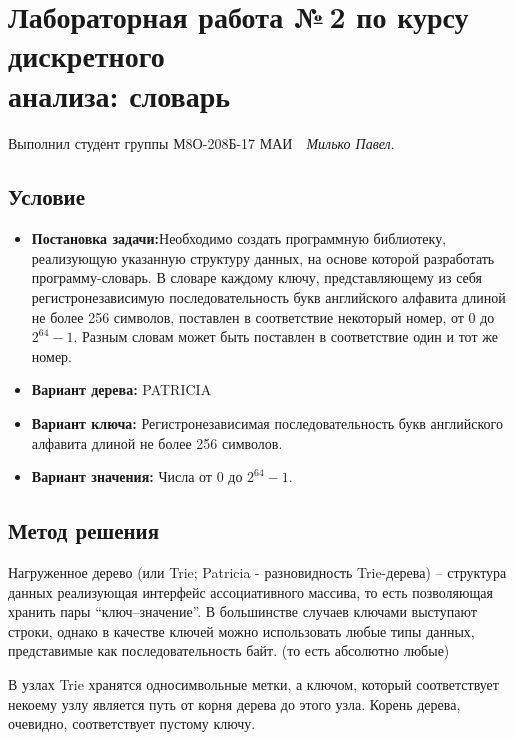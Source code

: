\documentclass[12pt]{article}
\begin{document}
\section*{Лабораторная работа №\,2 по курсу дискретного\\ анализа: словарь}

Выполнил студент группы М8О-208Б-17 МАИ \,\, \textit{Милько Павел}.

\subsection*{Условие}



\begin{itemize}
\item {\bf Постановка задачи:}\subitem Необходимо создать программную библиотеку, реализующую указанную структуру данных, на основе которой разработать программу-словарь. В словаре каждому ключу, представляющему из себя регистронезависимую последовательность букв английского алфавита длиной не более 256 символов, поставлен в соответствие некоторый номер, от 0 до $2^{64} - 1$. Разным словам может быть поставлен в соответствие один и тот же номер.

\item {\bf Вариант дерева: }\subitem  PATRICIA

\item{ \bf Вариант ключа:} \subitem Регистронезависимая последовательность букв английского алфавита длиной не более 256 символов.


\item {\bf Вариант значения:} \subitem   Числа от $0$ до $2^{64} − 1$.

\end{itemize}

\subsection*{Метод решения}


Нагруженное дерево (или Trie; Patricia - разновидность Trie-дерева) -- структура данных реализующая интерфейс ассоциативного массива, то есть позволяющая хранить пары ``ключ--значение''. В большинстве случаев ключами выступают строки, однако в качестве ключей можно использовать любые типы данных, представимые как последовательность байт. {\small (то есть абсолютно любые)}


В узлах Trie хранятся односимвольные метки, а ключом, который соответствует некоему узлу является путь от корня дерева до этого узла.
Корень дерева, очевидно, соответствует пустому ключу.
\end{document}
